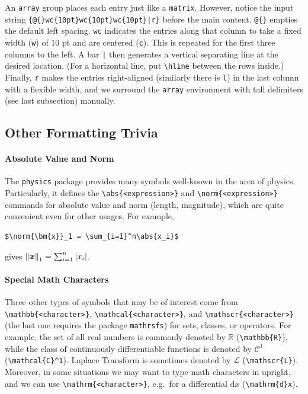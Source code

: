 An \verb|array| group places each entry just like a \verb|matrix|. However, notice the input string \texttt{\{@\{\}wc\{10pt\}wc\{10pt\}wc\{10pt\}|r\}} before the main content. \texttt{@\{\}} empties the default left spacing. \texttt{wc} indicates the entries along that column to take a fixed width (\verb|w|) of $10$ pt and are centered (\verb|c|). This is repeated for the first three columns to the left. A bar \texttt{|}\index{\texttt{|}} then generates a vertical separating line at the desired location. (For a horizontal line, put \texttt{\textbackslash hline} between the rows inside.) Finally, \texttt{r} makes the entries right-aligned (similarly there is \verb|l|) in the last column with a flexible width, and we surround the \verb|array| environment with tall delimiters (see last subsection) manually.

\subsection{Other Formatting Trivia}

\paragraph{Absolute Value and Norm}
The \verb|physics| package provides many symbols well-known in the area of physics. Particularly, it defines the \texttt{\textbackslash abs\{<expression>\}} and \texttt{\textbackslash norm\{<expression>\}} commands for absolute value and norm (length, magnitude), which are quite convenient even for other usages. For example, 
\begin{lstlisting}
$\norm{\bm{x}}_1 = \sum_{i=1}^n\abs{x_i}$
\end{lstlisting}
gives $\norm{\bm{x}}_1 = \sum_{i=1}^n\abs{x_i}$.

\paragraph{Special Math Characters}
Three other types of symbols that may be of interest come from \texttt{\textbackslash mathbb\{<character>\}}, \texttt{\textbackslash mathcal\{<character>\}}, and \texttt{\textbackslash mathscr\{<character>\}} (the last one requires the package \texttt{mathrsfs}) for sets, classes, or operators. For example, the set of all real numbers is commonly denoted by $\mathbb{R}$ (\texttt{\textbackslash mathbb\{R\}}), while the class of continuously differentiable functions is denoted by $\mathcal{C}^1$ (\texttt{\textbackslash mathcal\{C\}\^{}1}). Laplace Transform is sometimes denoted by $\mathscr{L}$ (\texttt{\textbackslash mathscr\{L\}}). Moreover, in some situations we may want to type math characters in upright, and we can use \texttt{\textbackslash mathrm\{<character>\}}, e.g.\ for a differential $\mathrm{d}x$ (\texttt{\textbackslash mathrm\{d\}x}).

